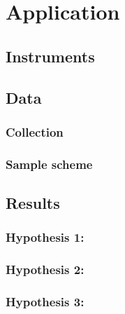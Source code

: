 \chapter{Application}

\section{Instruments}



\section{Data}

\subsection{Collection}

\subsection{Sample scheme}



\section{Results}

\subsection{Hypothesis 1: }

\subsection{Hypothesis 2: }

\subsection{Hypothesis 3: }
